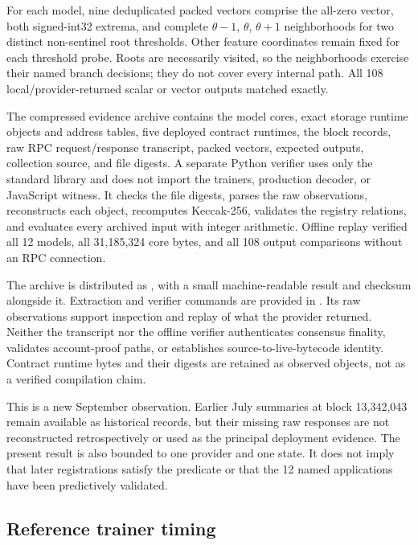 \documentclass{ledger}
\begin{document}
For each model, nine deduplicated packed vectors comprise the all-zero vector,
both signed-int32 extrema, and complete $\theta-1$, $\theta$, $\theta+1$
neighborhoods for two distinct non-sentinel root thresholds. Other feature
coordinates remain fixed for each threshold probe. Roots are necessarily
visited, so the neighborhoods exercise their named branch decisions; they
do not cover every internal path. All 108 local/provider-returned scalar or
vector outputs matched exactly.

The compressed evidence archive contains the model cores, exact storage
runtime objects and address tables, five deployed contract runtimes, the
block records, raw RPC request/response transcript, packed vectors, expected
outputs, collection source, and file digests. A separate Python verifier uses
only the standard library and does not import the trainers, production
decoder, or JavaScript witness. It checks the file digests, parses the raw
observations, reconstructs each object, recomputes Keccak-256, validates the
registry relations, and evaluates every archived input with integer
arithmetic. Offline replay verified all 12 models, all 31,185,324 core bytes,
and all 108 output comparisons without an RPC connection.

The archive is distributed as
, with a small
machine-readable result and checksum alongside it. Extraction and verifier
commands are provided in . Its raw observations
support inspection and replay of what the provider returned. Neither the
transcript nor the offline verifier authenticates consensus finality,
validates account-proof paths, or establishes source-to-live-bytecode
identity. Contract runtime bytes and their digests are retained as observed
objects, not as a verified compilation claim.

This is a new September observation. Earlier July summaries at block
13,342,043 remain available as historical records, but their missing raw
responses are not reconstructed retrospectively or used as the principal
deployment evidence. The present result is also bounded to one provider and
one state. It does not imply that later registrations satisfy the predicate
or that the 12 named applications have been predictively validated.


\subsection{Reference trainer timing}
\end{document}
